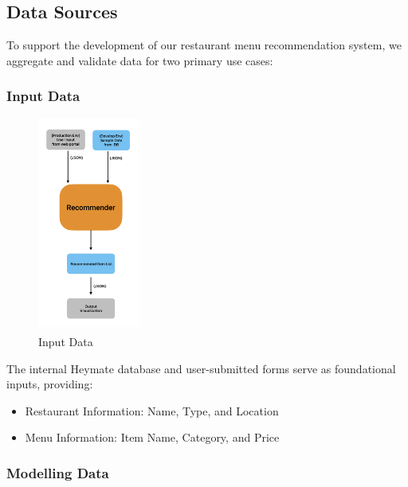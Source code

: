 \documentclass[
  11pt,
  a4paper,
  DIV=11,
  numbers=noendperiod]{scrartcl}
\providecommand{\tightlist}{%
  \setlength{\itemsep}{0pt}\setlength{\parskip}{0pt}}\usepackage{longtable,booktabs,array}
\begin{document}
\subsection{Data Sources}\label{data-sources}

To support the development of our restaurant menu recommendation system,
we aggregate and validate data for two primary use cases:

\subsubsection{Input Data}\label{input-data}

\begin{figure}[H]

\caption{Input Data}

{\centering \includegraphics[width=0.3\textwidth,height=\textheight]{../image/3_input_data.png}

}

\end{figure}%

The internal Heymate database and user-submitted forms serve as
foundational inputs, providing:

\begin{itemize}
\tightlist
\item
  Restaurant Information: Name, Type, and Location\\
\item
  Menu Information: Item Name, Category, and Price
\end{itemize}

\subsubsection{Modelling Data}\label{modelling-data}
\end{document}
